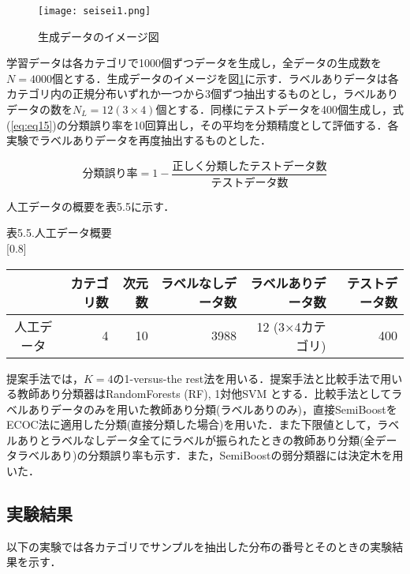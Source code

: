 \begin{figure}[H]
\centering
\texttt{[image: seisei1.png]}
\caption{生成データのイメージ図}
\label{seisei}
\end{figure}\par

学習データは各カテゴリで1000個ずつデータを生成し，全データの生成数を$N=4000$個とする．生成データのイメージを図\ref{seisei}に示す．ラベルありデータは各カテゴリ内の正規分布いずれか一つから3個ずつ抽出するものとし，ラベルありデータの数を$N_L=12(3×4)$個とする．同様にテストデータを400個生成し，式(\ref{eq:eq15})の分類誤り率を10回算出し，その平均を分類精度として評価する．各実験でラベルありデータを再度抽出するものとした．

\begin{equation}
\label{eq:eq15}
分類誤り率 = 1-\frac{正しく分類したテストデータ数}{テストデータ数}
\end{equation}\par
人工データの概要を表5.5に示す．\par


\begin{center}
表5.5.人工データ概要\\
\scalebox{0.75}[0.8]{
\begin{tabular}{c|r|r|r|r|r|}
\hline
&カテゴリ数&次元数&ラベルなしデータ数&ラベルありデータ数&テストデータ数\\
\hline\hline
人工データ&4&10&3988&12 (3×4カテゴリ)&400\\
\hline
\end{tabular}
}
\end{center}\par

提案手法では，$K=4$の1-versus-the rest法を用いる．提案手法と比較手法で用いる教師あり分類器はRandomForests (RF), 1対他SVM とする．比較手法としてラベルありデータのみを用いた教師あり分類(ラベルありのみ)，直接SemiBoostをECOC法に適用した分類(直接分類した場合)を用いた．また下限値として，ラベルありとラベルなしデータ全てにラベルが振られたときの教師あり分類(全データラベルあり)の分類誤り率も示す．また，SemiBoostの弱分類器には決定木を用いた．


\subsection{実験結果}
\label{sec:人工データを用いた実験結果}
以下の実験では各カテゴリでサンプルを抽出した分布の番号とそのときの実験結果を示す．

